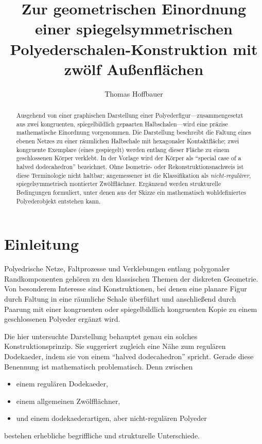 \documentclass[11pt]{article}
\title{Zur geometrischen Einordnung einer spiegelsymmetrischen\\
	Polyederschalen-Konstruktion mit zwölf Außenflächen}
\author{Thomas Hoffbauer}
\date{}
\theoremstyle{plain}
\theoremstyle{definition}
\theoremstyle{remark}
\begin{document}
	\maketitle
	
	\begin{abstract}
		Ausgehend von einer graphischen Darstellung einer Polyederfigur---zusammengesetzt aus zwei kongruenten, spiegelbildlich gepaarten Halbschalen---wird eine präzise mathematische Einordnung vorgenommen. Die Darstellung beschreibt die Faltung eines ebenen Netzes zu einer räumlichen Halbschale mit hexagonaler Kontaktfläche; zwei kongruente Exemplare (eines gespiegelt) werden entlang dieser Fläche zu einem geschlossenen Körper verklebt. In der Vorlage wird der Körper als \enquote{special case of a halved dodecahedron} bezeichnet. Ohne Isometrie- oder Rekonstruktionsnachweis ist diese Terminologie nicht haltbar; angemessener ist die Klassifikation als \emph{nicht-regulärer}, spiegelsymmetrisch montierter Zwölfflächner. Ergänzend werden strukturelle Bedingungen formuliert, unter denen aus der Skizze ein mathematisch wohldefiniertes Polyederobjekt entstehen kann.
	\end{abstract}
	
	\section{Einleitung}
	
	Polyedrische Netze, Faltprozesse und Verklebungen entlang polygonaler Randkomponenten gehören zu den klassischen Themen der diskreten Geometrie. Von besonderem Interesse sind Konstruktionen, bei denen eine planare Figur durch Faltung in eine räumliche Schale überführt und anschließend durch Paarung mit einer kongruenten oder spiegelbildlich kongruenten Kopie zu einem geschlossenen Polyeder ergänzt wird.
	
	Die hier untersuchte Darstellung behauptet genau ein solches Konstruktionsprinzip. Sie suggeriert zugleich eine Nähe zum regulären Dodekaeder, indem sie von einem \enquote{halved dodecahedron} spricht. Gerade diese Benennung ist mathematisch problematisch. Denn zwischen
	\begin{itemize}
		\item einem regulären Dodekaeder,
		\item einem allgemeinen Zwölfflächner,
		\item und einem dodekaederartigen, aber nicht-regulären Polyeder
	\end{itemize}
	bestehen erhebliche begriffliche und strukturelle Unterschiede.
	
\end{document}
